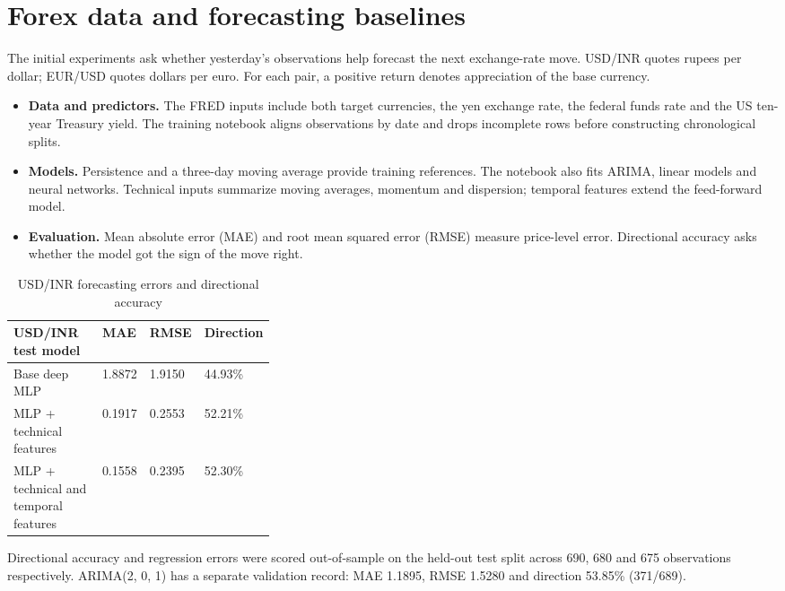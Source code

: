 \documentclass[12pt,a4paper,twoside,openany]{report}
\begin{document}
\section{Forex data and forecasting baselines}\label{exp:1}
The initial experiments ask whether yesterday's observations help forecast the next exchange-rate move. USD/INR quotes rupees per dollar; EUR/USD quotes dollars per euro. For each pair, a positive return denotes appreciation of the base currency.\par
\begin{itemize}\item \textbf{Data and predictors.} The FRED inputs include both target currencies, the yen exchange rate, the federal funds rate and the US ten-year Treasury yield. The training notebook aligns observations by date and drops incomplete rows before constructing chronological splits.\end{itemize}
\begin{itemize}\item \textbf{Models.} Persistence and a three-day moving average provide training references. The notebook also fits ARIMA, linear models and neural networks. Technical inputs summarize moving averages, momentum and dispersion; temporal features extend the feed-forward model.\end{itemize}
\begin{itemize}\item \textbf{Evaluation.} Mean absolute error (MAE) and root mean squared error (RMSE) measure price-level error. Directional accuracy asks whether the model got the sign of the move right.\end{itemize}
\begin{table}[htbp]\centering\singlespacing
\caption{USD/INR forecasting errors and directional accuracy}
\begin{tabularx}{\linewidth}{@{}p{0.34\linewidth}XXX@{}}\toprule
USD/INR test model & MAE & RMSE & Direction\\\midrule
Base deep MLP & 1.8872 & 1.9150 & 44.93\%\\
MLP + technical features & 0.1917 & 0.2553 & 52.21\%\\
MLP + technical and temporal features & 0.1558 & 0.2395 & 52.30\%\\
\bottomrule\end{tabularx}
\end{table}
Directional accuracy and regression errors were scored out-of-sample on the held-out test split across 690, 680 and 675 observations respectively. ARIMA(2, 0, 1) has a separate validation record: MAE 1.1895, RMSE 1.5280 and direction 53.85\% (371/689).\par
\end{document}
